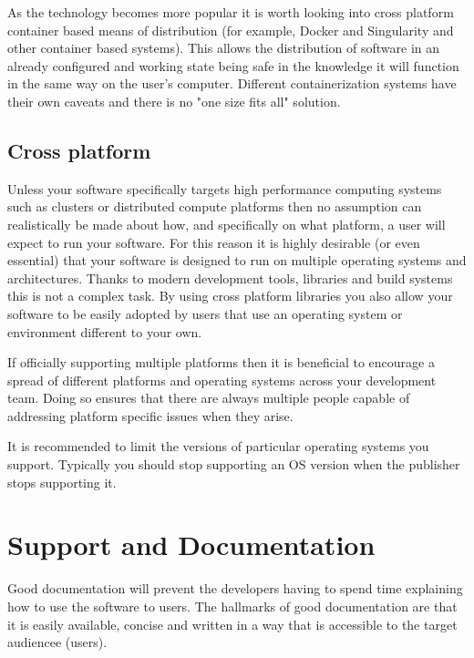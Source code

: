 \documentclass[jnr]{iosart2x}
\begin{document}
As the technology becomes more popular it is worth looking into cross platform container based means of distribution (for example, Docker \cite{Docker} and Singularity \cite{Kurtzer_2017} and other container based systems).
This allows the distribution of software in an already configured and working state being safe in the knowledge it will function in the same way on the user's computer.
Different containerization systems have their own caveats and there is no "one size fits all" solution.

\subsection{Cross platform}
\label{Cross platform}

Unless your software specifically targets high performance computing systems such as clusters or distributed compute platforms then no assumption can realistically be made about how, and specifically on what platform, a user will expect to run your software.
For this reason it is highly desirable (or even essential) that your software is designed to run on multiple operating systems and architectures.
Thanks to modern development tools, libraries and build systems this is not a complex task.
By using cross platform libraries you also allow your software to be easily adopted by users that use an operating system or environment different to your own.

If officially supporting multiple platforms then it is beneficial to encourage a spread of different platforms and operating systems across your development team.
Doing so ensures that there are always multiple people capable of addressing platform specific issues when they arise.

It is recommended to limit the versions of particular operating systems you support.
Typically you should stop supporting an OS version when the publisher stops supporting it.

\section{Support and Documentation}
\label{Support and Documentation}

Good documentation will prevent the developers having to spend time explaining how to use the software to users.
The hallmarks of good documentation are that it is easily available, concise and written in a way that is accessible to the target audiencee (users).
\end{document}
